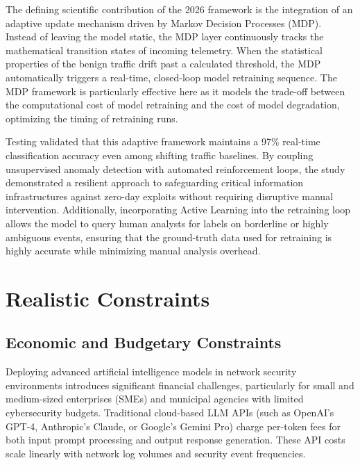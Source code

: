 \documentclass[12pt,a4paper]{report}
\begin{document}
The defining scientific contribution of the 2026 framework is the integration of an adaptive update mechanism driven by Markov Decision Processes (MDP). Instead of leaving the model static, the MDP layer continuously tracks the mathematical transition states of incoming telemetry. When the statistical properties of the benign traffic drift past a calculated threshold, the MDP automatically triggers a real-time, closed-loop model retraining sequence. The MDP framework is particularly effective here as it models the trade-off between the computational cost of model retraining and the cost of model degradation, optimizing the timing of retraining runs.

Testing validated that this adaptive framework maintains a 97\% real-time classification accuracy even among shifting traffic baselines. By coupling unsupervised anomaly detection with automated reinforcement loops, the study demonstrated a resilient approach to safeguarding critical information infrastructures against zero-day exploits without requiring disruptive manual intervention. Additionally, incorporating Active Learning into the retraining loop allows the model to query human analysts for labels on borderline or highly ambiguous events, ensuring that the ground-truth data used for retraining is highly accurate while minimizing manual analysis overhead.

\chapter{Realistic Constraints}

\section{Economic and Budgetary Constraints}

Deploying advanced artificial intelligence models in network security environments introduces significant financial challenges, particularly for small and medium-sized enterprises (SMEs) and municipal agencies with limited cybersecurity budgets. Traditional cloud-based LLM APIs (such as OpenAI's GPT-4, Anthropic's Claude, or Google's Gemini Pro) charge per-token fees for both input prompt processing and output response generation. These API costs scale linearly with network log volumes and security event frequencies.
\end{document}
